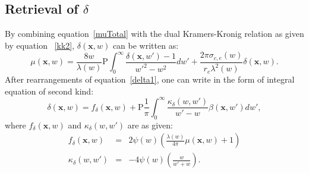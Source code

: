 \documentclass[12pt]{article}
\begin{document}
\subsection{Retrieval of $\delta$}
By combining equation~\ref{muTotal} with the dual Kramers-Kronig relation as given by equation~ \ref{kk2}, $\delta(\textbf{x},w)$ can be written as:
\begin{equation}
 \mu(\textbf{x},w) = \frac{8w}{\lambda(w)}\mathrm{P} \int_0^\infty\frac{\delta(\textbf{x},w')-1}{w'^2-w^2}dw' +\frac{2\pi\sigma_{c,e}(w)}{r_e\lambda^2(w)}\delta(\textbf{x},w).
 \label{delta1}
\end{equation}
After rearrangements of equation~\ref{delta1}, one can write in the form of integral equation of second kind:
\begin{equation}
 \delta(\textbf{x},w) = f_\delta(\textbf{x},w) + \mathrm{P}\frac{1}{\pi}\int_0^\infty\frac{\kappa_\delta(w,w')}{w'-w}\beta(\textbf{x},w')dw',
\end{equation}
where $f_\delta(\textbf{x},w)$ and $\kappa_\delta(w,w')$ are as given:
\begin{eqnarray}
 f_\delta(\textbf{x},w) &=& 2\psi(w)\left(  \frac{\lambda(w)}{4\pi}\mu(\textbf{x},w) + 1 \right) \\
 \kappa_\delta(w,w') &=& -4\psi(w)\left( \frac{w}{w'+w} \right).
\end{eqnarray}
\end{document}
